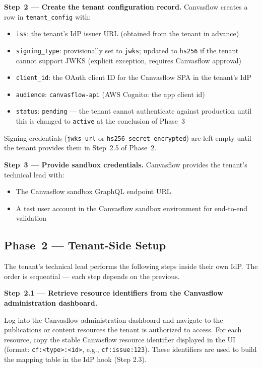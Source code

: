 \textbf{Step~2 --- Create the tenant configuration record.} Canvasflow creates a row in
\texttt{tenant\_config} with:
\begin{itemize}
  \item \texttt{iss}: the tenant's IdP issuer URL (obtained from the tenant in advance)
  \item \texttt{signing\_type}: provisionally set to \texttt{jwks}; updated to
    \texttt{hs256} if the tenant cannot support JWKS (explicit exception, requires
    Canvasflow approval)
  \item \texttt{client\_id}: the OAuth client ID for the Canvasflow SPA in the tenant's
    IdP
  \item \texttt{audience}: \texttt{canvasflow-api} (AWS Cognito: the app client id)
  \item \texttt{status}: \texttt{pending} --- the tenant cannot authenticate against
    production until this is changed to \texttt{active} at the conclusion of Phase~3
\end{itemize}

Signing credentials (\texttt{jwks\_url} or \texttt{hs256\_secret\_encrypted}) are left
empty until the tenant provides them in Step~2.5 of Phase~2.

\textbf{Step~3 --- Provide sandbox credentials.} Canvasflow provides the tenant's
technical lead with:
\begin{itemize}
  \item The Canvasflow sandbox GraphQL endpoint URL
  \item A test user account in the Canvasflow sandbox environment for end-to-end
    validation
\end{itemize}

\subsection{Phase~2 --- Tenant-Side Setup}\label{sec:tenant-side-setup}

The tenant's technical lead performs the following steps inside their own IdP. The order
is sequential --- each step depends on the previous.

\textbf{Step~2.1 --- Retrieve resource identifiers from the Canvasflow administration dashboard.}

Log into the Canvasflow administration dashboard and navigate to the publications 
or content resources the tenant is authorized to access. For each resource, 
copy the stable Canvasflow resource identifier displayed in the 
UI (format: \texttt{cf:<type>:<id>}, e.g., \texttt{cf:issue:123}). These 
identifiers are used to build the mapping table in the IdP hook (Step 2.3).

